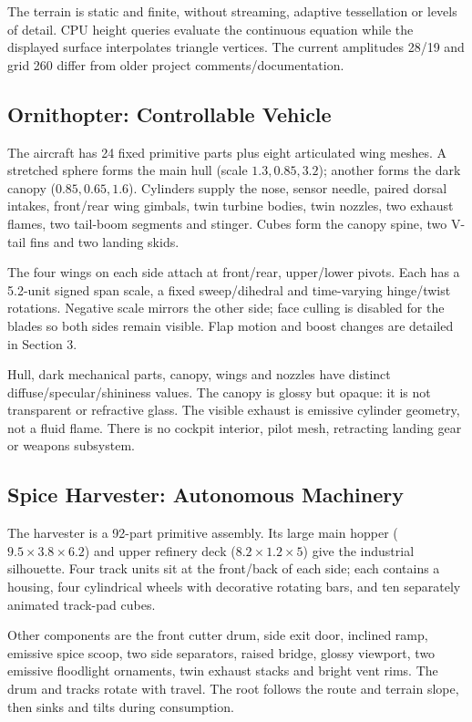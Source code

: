 The terrain is static and finite, without streaming, adaptive tessellation or levels of detail. CPU height queries evaluate the continuous equation while the displayed surface interpolates triangle vertices. The current amplitudes 28/19 and grid 260 differ from older project comments/documentation.

\subsection{Ornithopter: Controllable Vehicle}
The aircraft has 24 fixed primitive parts plus eight articulated wing meshes. A stretched sphere forms the main hull (scale $1.3,0.85,3.2$); another forms the dark canopy ($0.85,0.65,1.6$). Cylinders supply the nose, sensor needle, paired dorsal intakes, front/rear wing gimbals, twin turbine bodies, twin nozzles, two exhaust flames, two tail-boom segments and stinger. Cubes form the canopy spine, two V-tail fins and two landing skids.

The four wings on each side attach at front/rear, upper/lower pivots. Each has a 5.2-unit signed span scale, a fixed sweep/dihedral and time-varying hinge/twist rotations. Negative scale mirrors the other side; face culling is disabled for the blades so both sides remain visible. Flap motion and boost changes are detailed in Section 3.

Hull, dark mechanical parts, canopy, wings and nozzles have distinct diffuse/specular/shininess values. The canopy is glossy but opaque: it is not transparent or refractive glass. The visible exhaust is emissive cylinder geometry, not a fluid flame. There is no cockpit interior, pilot mesh, retracting landing gear or weapons subsystem.

\subsection{Spice Harvester: Autonomous Machinery}
The harvester is a 92-part primitive assembly. Its large main hopper ($9.5\times3.8\times6.2$) and upper refinery deck ($8.2\times1.2\times5$) give the industrial silhouette. Four track units sit at the front/back of each side; each contains a housing, four cylindrical wheels with decorative rotating bars, and ten separately animated track-pad cubes.

Other components are the front cutter drum, side exit door, inclined ramp, emissive spice scoop, two side separators, raised bridge, glossy viewport, two emissive floodlight ornaments, twin exhaust stacks and bright vent rims. The drum and tracks rotate with travel. The root follows the route and terrain slope, then sinks and tilts during consumption.


